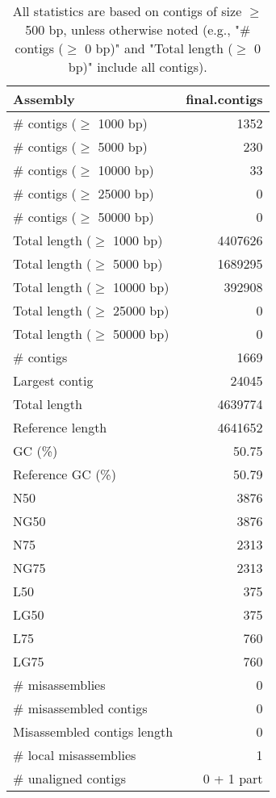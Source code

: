 \documentclass[12pt,a4paper]{article}
\begin{document}
\begin{table}[ht]
\begin{center}
\caption{All statistics are based on contigs of size $\geq$ 500 bp, unless otherwise noted (e.g., "\# contigs ($\geq$ 0 bp)" and "Total length ($\geq$ 0 bp)" include all contigs).}
\begin{tabular}{|l*{1}{|r}|}
\hline
Assembly & final.contigs \\ \hline
\# contigs ($\geq$ 1000 bp) & 1352 \\ \hline
\# contigs ($\geq$ 5000 bp) & 230 \\ \hline
\# contigs ($\geq$ 10000 bp) & 33 \\ \hline
\# contigs ($\geq$ 25000 bp) & 0 \\ \hline
\# contigs ($\geq$ 50000 bp) & 0 \\ \hline
Total length ($\geq$ 1000 bp) & 4407626 \\ \hline
Total length ($\geq$ 5000 bp) & 1689295 \\ \hline
Total length ($\geq$ 10000 bp) & 392908 \\ \hline
Total length ($\geq$ 25000 bp) & 0 \\ \hline
Total length ($\geq$ 50000 bp) & 0 \\ \hline
\# contigs & 1669 \\ \hline
Largest contig & 24045 \\ \hline
Total length & 4639774 \\ \hline
Reference length & 4641652 \\ \hline
GC (\%) & 50.75 \\ \hline
Reference GC (\%) & 50.79 \\ \hline
N50 & 3876 \\ \hline
NG50 & 3876 \\ \hline
N75 & 2313 \\ \hline
NG75 & 2313 \\ \hline
L50 & 375 \\ \hline
LG50 & 375 \\ \hline
L75 & 760 \\ \hline
LG75 & 760 \\ \hline
\# misassemblies & 0 \\ \hline
\# misassembled contigs & 0 \\ \hline
Misassembled contigs length & 0 \\ \hline
\# local misassemblies & 1 \\ \hline
\# unaligned contigs & 0 + 1 part \\ \hline

\end{tabular}
\end{center}
\end{table}
\end{document}
